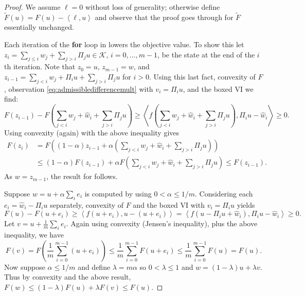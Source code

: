 \documentclass[letterpaper,final,12pt,reqno]{amsart}
\theoremstyle{cstyle}
\theoremstyle{cstyle*}
\theoremstyle{dstyle}
\numberwithin{equation}{section}
\numberwithin{figure}{section}
\numberwithin{table}{section}
\numberwithin{theorem}{section}
\newcommand{\cK}{\mathcal{K}}
\newcommand{\ip}[2]{\left<#1,#2\right>}
\begin{document}
\begin{proof}  We assume $\ell=0$ without loss of generality; otherwise define $\tilde F(u)=F(u) - \ip{\ell}{u}$ and observe that the proof goes through for $\tilde F$ essentially unchanged.

Each iteration of the \textbf{for} loop in  lowers the objective value.  To show this let $z_{i} = \sum_{j\le i} w_j + \sum_{j > i} \Pi_j u \in \cK$, $i=0,\dots,m-1$, be the state at the end of the $i$th iteration.  Note that $z_0=u$, $z_{m-1}=w$, and $z_{i-1} = \sum_{j < i} w_j + \Pi_i u + \sum_{j > i} \Pi_j u$ for $i>0$.  Using this last fact, convexity of $F$, observation \eqref{eq:admissibledifferencemult} with $v_i=\Pi_i u$, and the boxed VI we find:
\begin{equation*}
F(z_{i-1}) - F\left(\sum_{j<i} w_j + \hat w_i + \sum_{j > i} \Pi_j u\right) \ge \ip{f\left(\sum_{j<i} w_j + \hat w_i + \sum_{j > i} \Pi_j u\right)}{\Pi_i u - \hat w_i} \ge 0.
\end{equation*}
Using convexity (again) with the above inequality gives
\begin{align*}
F(z_i) &= F\left((1-\alpha) z_{i-1} + \alpha \left(\sum_{j<i} w_j + \hat w_i + \sum_{j > i} \Pi_j u\right)\right) \\
&\le  (1-\alpha) F(z_{i-1}) + \alpha F\left(\sum_{j<i} w_j + \hat w_i + \sum_{j > i} \Pi_j u\right) \le F(z_{i-1}).
\end{align*}
As $w = z_{m-1}$, the result for  follows.

Suppose $w=u+\alpha\sum_i e_i$ is computed by  using $0<\alpha \le 1/m$.  Considering each $e_i=\hat w_i - \Pi_i u$ separately, convexity of $F$ and the boxed VI with $v_i=\Pi_i u$ yields
\begin{equation}
F(u) - F(u+e_i) \ge \ip{f(u+e_i)}{u-(u+e_i)} = \ip{f(u-\Pi_i u + \hat w_i)}{\Pi_i u - \hat w_i} \ge 0. \label{eq:cdaddonereduction}
\end{equation}
Let $v = u+ \frac{1}{m} \sum_i e_i$.  Again using convexity (Jensen's inequality), plus the above inequality, we have
\begin{equation*}
F(v) = F\left(\frac{1}{m} \sum_{i=0}^{m-1} (u+e_i)\right) \le \frac{1}{m} \sum_{i=0}^{m-1} F(u+e_i) \le \frac{1}{m} \sum_{i=0}^{m-1} F(u) = F(u).
\end{equation*}
Now suppose $\alpha \le 1/m$ and define $\lambda = m\alpha$ so $0<\lambda\le 1$ and $w = (1-\lambda) u + \lambda v$.  Thus by convexity and the above result, $F(w) \le (1-\lambda) F(u) + \lambda F(v) \le F(u)$.
\end{proof}
\end{document}
